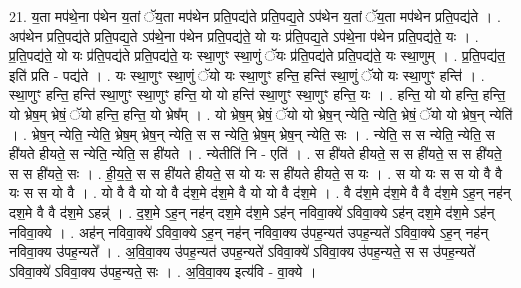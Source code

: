 \documentclass[17pt]{extarticle}
\begin{document}
21. य॒ता मप॑थे॒ना प॑थेन य॒तां ॅय॒ता मप॑थेन प्रति॒पद्य॑ते प्रति॒पद्य॒ते ऽप॑थेन य॒तां ॅय॒ता मप॑थेन प्रति॒पद्य॑ते । . अप॑थेन प्रति॒पद्य॑ते प्रति॒पद्य॒ते ऽप॑थे॒ना प॑थेन प्रति॒पद्य॑ते॒ यो यः प्र॑ति॒पद्य॒ते ऽप॑थे॒ना प॑थेन प्रति॒पद्य॑ते॒ यः । . प्र॒ति॒पद्य॑ते॒ यो यः प्र॑ति॒पद्य॑ते प्रति॒पद्य॑ते॒ यः स्था॒णुꣳ स्था॒णुं ॅयः प्र॑ति॒पद्य॑ते प्रति॒पद्य॑ते॒ यः स्था॒णुम् । . प्र॒ति॒पद्य॑त॒ इति॑ प्रति - पद्य॑ते । . यः स्था॒णुꣳ स्था॒णुं ॅयो यः स्था॒णुꣳ हन्ति॒ हन्ति॑ स्था॒णुं ॅयो यः स्था॒णुꣳ हन्ति॑ । . स्था॒णुꣳ हन्ति॒ हन्ति॑ स्था॒णुꣳ स्था॒णुꣳ हन्ति॒ यो यो हन्ति॑ स्था॒णुꣳ स्था॒णुꣳ हन्ति॒ यः । . हन्ति॒ यो यो हन्ति॒ हन्ति॒ यो भ्रेष॒म् भ्रेषं॒ ॅयो हन्ति॒ हन्ति॒ यो भ्रेष᳚म् । . यो भ्रेष॒म् भ्रेषं॒ ॅयो यो भ्रेष॒न् न्येति॒ न्येति॒ भ्रेषं॒ ॅयो यो भ्रेष॒न् न्येति॑ । . भ्रेष॒न् न्येति॒ न्येति॒ भ्रेष॒म् भ्रेष॒न् न्येति॒ स स न्येति॒ भ्रेष॒म् भ्रेष॒न् न्येति॒ सः । . न्येति॒ स स न्येति॒ न्येति॒ स ही॑यते हीयते॒ स न्येति॒ न्येति॒ स ही॑यते । . न्येतीति॑ नि - एति॑ । . स ही॑यते हीयते॒ स स ही॑यते॒ स स ही॑यते॒ स स ही॑यते॒ सः । . ही॒य॒ते॒ स स ही॑यते हीयते॒ स यो यः स ही॑यते हीयते॒ स यः । . स यो यः स स यो वै वै यः स स यो वै । . यो वै वै यो यो वै द॑श॒मे द॑श॒मे वै यो यो वै द॑श॒मे । . वै द॑श॒मे द॑श॒मे वै वै द॑श॒मे ऽह॒न् नह॑न् दश॒मे वै वै द॑श॒मे ऽहन्न्॑ । . द॒श॒मे ऽह॒न् नह॑न् दश॒मे द॑श॒मे ऽह॑न् नविवा॒क्ये॑ ऽविवा॒क्ये ऽह॑न् दश॒मे द॑श॒मे ऽह॑न् नविवा॒क्ये । . अह॑न् नविवा॒क्ये॑ ऽविवा॒क्ये ऽह॒न् नह॑न् नविवा॒क्य उ॑पह॒न्यत॑ उपह॒न्यते॑ ऽविवा॒क्ये ऽह॒न् नह॑न् नविवा॒क्य उ॑पह॒न्यते᳚ । . अ॒वि॒वा॒क्य उ॑पह॒न्यत॑ उपह॒न्यते॑ ऽविवा॒क्ये॑ ऽविवा॒क्य उ॑पह॒न्यते॒ स स उ॑पह॒न्यते॑ ऽविवा॒क्ये॑ ऽविवा॒क्य उ॑पह॒न्यते॒ सः । . अ॒वि॒वा॒क्य इत्य॑वि - वा॒क्ये । \newline
\end{document}
